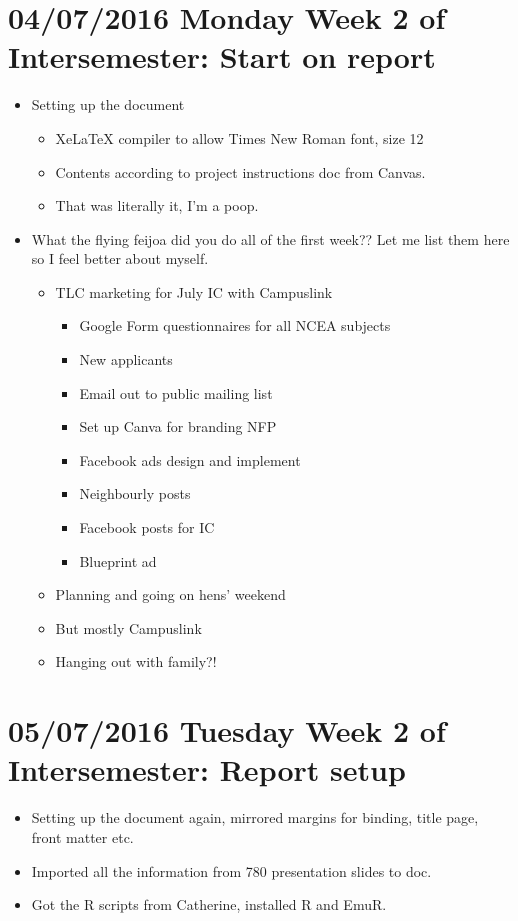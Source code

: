 \documentclass{article}
\begin{document}
\section*{04/07/2016 Monday Week 2 of Intersemester: Start on report}
\begin{itemize}
    \item Setting up the document
    \begin{itemize}
        \item XeLaTeX compiler to allow Times New Roman font, size 12
        \item Contents according to project instructions doc from Canvas.
        \item That was literally it, I'm a poop.
    \end{itemize}
    \item What the flying feijoa did you do all of the first week?? Let me list them here so I feel better about myself.
    \begin{itemize}
        \item TLC marketing for July IC with Campuslink
        \begin{itemize}
            \item Google Form questionnaires for all NCEA subjects
            \item New applicants
            \item Email out to public mailing list
            \item Set up Canva for branding NFP
            \item Facebook ads design and implement
            \item Neighbourly posts
            \item Facebook posts for IC
            \item Blueprint ad
        \end{itemize}
        \item Planning and going on hens' weekend
        \item But mostly Campuslink
        \item Hanging out with family?!
    \end{itemize}
\end{itemize}

\section*{05/07/2016 Tuesday Week 2 of Intersemester: Report setup}
\begin{itemize}
    \item Setting up the document again, mirrored margins for binding, title page, front matter etc.
    \item Imported all the information from 780 presentation slides to doc.
    \item Got the R scripts from Catherine, installed R and EmuR.
\end{itemize}
\end{document}
